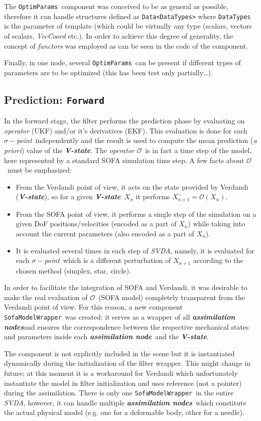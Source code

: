 \documentclass[10pt]{article}
\def\op{$\mathcal{O}$}
\def\asn{\textit{\textbf{assimilation node}}}
\def\asns{\textit{\textbf{assimilation nodes}}}
\def\vstate{\textit{\textbf{V-state}}}
\def\svda{\textit{SVDA}}
\def\smp{$\sigma-$\textit{point}}
\def\smw{\texttt{SofaModelWrapper}}
\def\opr{\texttt{OptimParams}}
\begin{document}
The \opr\ component was conceived to be as general as possible, therefore it can handle structures defined as \texttt{Data<DataTypes>} where
\texttt{DataTypes} is the parameter of template (which could be virtually any type (scalars, vectors of scalars, \emph{VecCoord} etc.). In order to
achieve this degree of generality, the concept of \emph{functors} was employed as can be seen in the code of the component. 

Finally, in one node, several  \opr\ can be present if different types of parameters are to be optimized (this has been test only partially\ldots).

\subsection{Prediction: \texttt{Forward}}
In the forward stage, the filter performs the prediction phase by evaluating on \emph{operator} (UKF) and/or it's derivatives (EKF). This evaluation
is done for each \smp\ independently and the 
result is used to compute the mean prediction (\emph{a priori}) value of the \vstate. The \emph{operator} \op\ is in fact a time step of the model,
here represented by a standard SOFA simulation time step.
A few facts about \op\ must be emphasized:
\begin{itemize}
\item From the Verdandi point of view, it acts on the state provided by Verdandi (\vstate), so for a given \vstate\ $X_n$ it performs $X^-_{n+1} =
\mathcal{O}(X_{n})$.  
\item From the SOFA point of view, it performs a single step of the simulation on a given DoF positions/velocities (encoded as a part of $X_n$)  while
taking into account the current parameters (also encoded as a part of $X_n$).
\item It is evaluated several times in each step of \svda, namely, it is evaluated for each \smp\ which is a different perturbation of $X_{n+1}$
according to the chosen method (simplex, star, circle). 
\end{itemize}

In order to facilitate the integration of SOFA and Verdandi, it was desirable to make the real evaluation of \op\ (SOFA model) completely transparent
from the Verdandi point of view. 
For this reason, a new component \smw\  was created: it serves as a wrapper of all \asns and ensures the correspondence between the respective
mechanical states and parameters 
inside each \asn\ and the \vstate.

The component is not explicitly included in the scene but it is instantiated dynamically during the initialization of the filter wrapper. 
This might change in future; at this moment it is a workaround for Verdandi which unfortunately instantiate the model in filter initialization and
uses reference (not a pointer) during the assimilation.
There is only one \smw\ in the entire \svda, however, it can handle multiple \asns\ which constitute the actual physical model  (e.g. one for a
deformable body, other for a needle).
\end{document}
